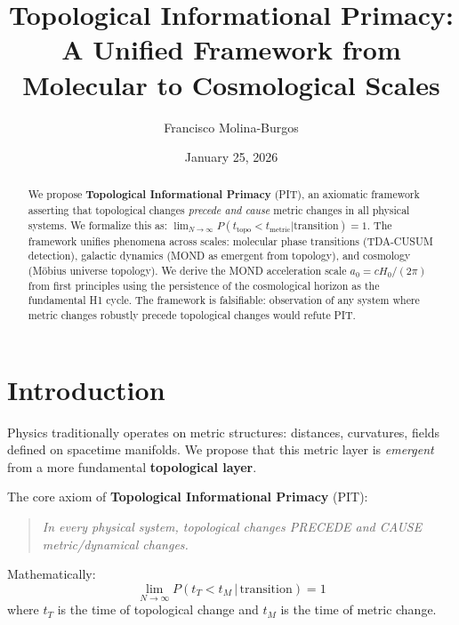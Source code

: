 \documentclass[aps,pre,twocolumn,superscriptaddress]{revtex4-2}
\begin{document}
\title{Topological Informational Primacy:\\
A Unified Framework from Molecular to Cosmological Scales}

\author{Francisco Molina-Burgos}

\date{January 25, 2026}

\begin{abstract}
We propose \textbf{Topological Informational Primacy} (PIT), an axiomatic framework asserting that topological changes \textit{precede and cause} metric changes in all physical systems. We formalize this as: $\lim_{N \to \infty} P(t_{\text{topo}} < t_{\text{metric}} | \text{transition}) = 1$. The framework unifies phenomena across scales: molecular phase transitions (TDA-CUSUM detection), galactic dynamics (MOND as emergent from topology), and cosmology (M\"obius universe topology). We derive the MOND acceleration scale $a_0 = cH_0/(2\pi)$ from first principles using the persistence of the cosmological horizon as the fundamental H1 cycle. The framework is falsifiable: observation of any system where metric changes robustly precede topological changes would refute PIT.
\end{abstract}

\maketitle

\section{Introduction}

Physics traditionally operates on metric structures: distances, curvatures, fields defined on spacetime manifolds. We propose that this metric layer is \textit{emergent} from a more fundamental \textbf{topological layer}.

The core axiom of \textbf{Topological Informational Primacy} (PIT):

\begin{quote}
\textit{In every physical system, topological changes PRECEDE and CAUSE metric/dynamical changes.}
\end{quote}

Mathematically:
\begin{equation}
\lim_{N \to \infty} P(t_T < t_M \,|\, \text{transition}) = 1
\end{equation}
where $t_T$ is the time of topological change and $t_M$ is the time of metric change.
\end{document}
